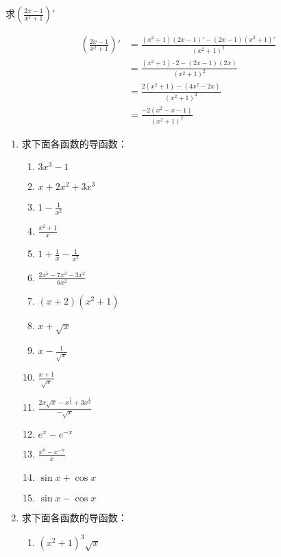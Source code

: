 \begin{example}
    求$\left(\frac{2x-1}{x^2+1}\right)'$
\end{example}

\begin{solution}
\[\begin{split}
    \left(\frac{2x-1}{x^2+1}\right)'&=\frac{(x^2+1)(2x-1)'-(2x-1)(x^2+1)'}{(x^2+1)^2}\\
&=\frac{(x^2+1)\cdot 2-(2x-1)(2x)}{(x^2+1)^2}\\
&=\frac{2(x^2+1)-(4x^2-2x)}{(x^2+1)^2}\\
&=\frac{-2(x^2-x-1)}{(x^2+1)^2}
\end{split}\]
\end{solution}

\begin{ex}
\begin{enumerate}
    \item  求下面各函数的导函数：
\begin{multicols}{2}
\begin{enumerate}
    \item $3 x^{3}-1$
    \item  $x+2 x^{2}+3 x^{3}$
    \item  $1-\frac{1}{x^{2}}$
    \item $\frac{x^{2}+1}{x}$
    \item  $1+\frac{1}{x}-\frac{1}{x^{2}}$
    \item  $\frac{2 x^{5}-7 x^{3}-3 x^{2}}{6 x^{2}}$
    \item  $(x+2)\left(x^{2}+1\right)$
    \item  $x+\sqrt{x}$
    \item $x-\frac{1}{\sqrt{x}}$
    \item  $\frac{x+1}{\sqrt{x}}$
    \item  $\frac{2 x \sqrt{x}-x^{\tfrac{5}{2}}+3 x^{\tfrac{1}{2}}}{-\sqrt{x}}$ \item  $e^{x}-e^{-x}$
    \item $\frac{x^{n}-x^{-n}}{x} $
    \item $\sin x+\cos x$
    \item $\sin x-\cos x$
\end{enumerate}
\end{multicols}
\item  求下面各函数的导函数：
\begin{multicols}{2}
\begin{enumerate}
    \item $\left(x^{2}+1\right)^{3} \sqrt{x}$

\end{enumerate}
\end{multicols}
\end{enumerate}
\end{ex}
